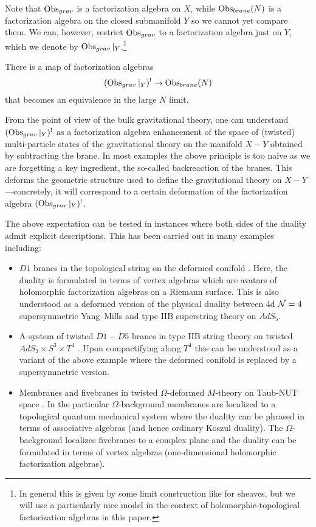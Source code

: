 \documentclass[11pt]{amsart}
\begin{document}
Note that $\operatorname{Obs}_{grav}$ is a factorization algebra on $X$, while $\operatorname{Obs}_{brane}(N)$ is a factorization algebra on the closed submanifold $Y$ so we cannot yet compare them.
We can, however, restrict $\operatorname{Obs}_{grav}$ to a factorization algebra just on $Y$, which we denote by $\operatorname{Obs}_{grav}|_Y$.\footnote{In general this is given by some limit construction like for sheaves, but we will use a particularly nice model in the context of holomorphic-topological factorization algebras in this paper.}

\begin{expect}
There is a map of factorization algebras
\[
  (\operatorname{Obs}_{grav}|_{Y})^{!}\to \operatorname{Obs}_{brane}(N)
\]
that becomes an equivalence in the large $N$ limit.
\end{expect}

From the point of view of the bulk gravitational theory, one can understand $(\operatorname{Obs}_{grav}|_{Y})^{!}$ as a factorization algebra enhancement of the space of (twisted) multi-particle states of the gravitational theory on the manifold $X - Y$ obtained by subtracting the brane. 
In most examples the above principle is too naive as we are forgetting a key ingredient, the so-called backreaction of the branes. 
This deforms the geometric structure used to define the gravitational theory on $X - Y$---concretely, it will correspond to a certain deformation of the factorization algebra $(\operatorname{Obs}_{grav}|_{Y})^{!}$. 

The above expectation can be tested in instances where both sides of the duality admit explicit descriptions. 
This has been carried out in many examples including:
\begin{itemize}
\item $D1$ branes in the topological string on the deformed conifold \cite{costello2021twisted}.
Here, the duality is formulated in terms of vertex algebras which are avatars of holomorphic factorization algebras on a Riemann surface.
This is also understood as a deformed version of the physical duality between 4d $\mathcal N=4$ supersymmetric Yang--Mills and type IIB superstring theory on $AdS_5$. 
\item A system of twisted $D1-D5$ branes in type IIB string theory on twisted $AdS_3 \times S^3 \times T^4$ \cite{CP1}. 
Upon compactifying along $T^4$ this can be understood as a variant of the above example where the deformed conifold is replaced by a supersymmetric version.
\item Membranes and fivebranes in twisted $\Omega$-deformed $M$-theory on Taub-NUT space \cite{CostelloM5,CostelloM2}.
In the particular $\Omega$-background membranes are localized to a topological quantum mechanical system where the duality can be phrased in terms of associative algebras (and hence ordinary Koszul duality). 
The $\Omega$-background localizes fivebranes to a complex plane and the duality can be formulated in terms of vertex algebras (one-dimensional holomorphic factorization algebras). 
\end{itemize}
\end{document}
